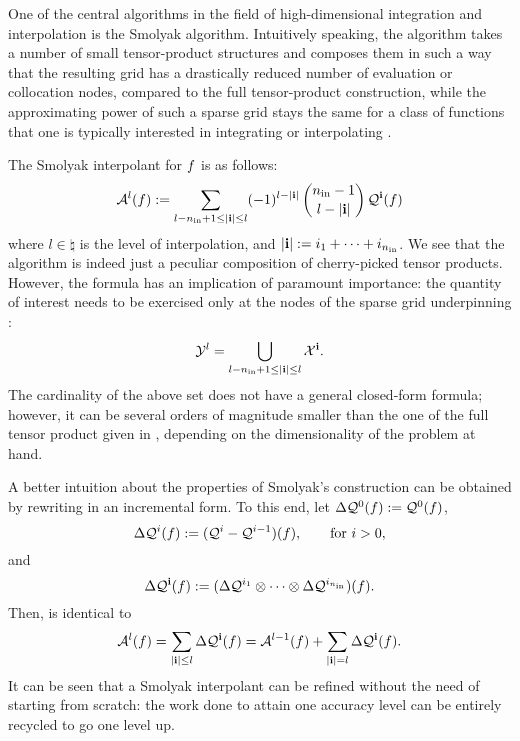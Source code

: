 One of the central algorithms in the field of high-dimensional integration and
interpolation is the Smolyak algorithm. Intuitively speaking, the algorithm
takes a number of small tensor-product structures and composes them in such a
way that the resulting grid has a drastically reduced number of evaluation or
collocation nodes, compared to the full tensor-product construction, while the
approximating power of such a sparse grid stays the same for a class of
functions that one is typically interested in integrating or interpolating
\cite{klimke2006}.

The Smolyak interpolant for $f$ is as follows:
\begin{equation} \elab{smolyak}
  \smolyak{l}(\f) := \sum_{l - \nin + 1 \leq |\vi| \leq l} (-1)^{l - |\vi|} \, {\nin - 1 \choose l - |\vi|} \, \tensor{\vi}(\f)
\end{equation}
where $l \in \natural$ is the level of interpolation, and $|\mathbf{i}| := i_1 + \dots
+ i_{n_\text{in}}$. We see that the algorithm is indeed just a peculiar composition of
cherry-picked tensor products. However, the formula has an implication of
paramount importance: the quantity of interest needs to be exercised only at the
nodes of the sparse grid underpinning :
\begin{equation} \elab{smolyak-grid}
  \Y^l = \bigcup_{l - \nin + 1 \leq |\vi| \leq l} \X^\vi.
\end{equation}
The cardinality of the above set does not have a general closed-form formula;
however, it can be several orders of magnitude smaller than the one of the full
tensor product given in , depending on the
dimensionality of the problem at hand.

A better intuition about the properties of Smolyak's construction can be
obtained by rewriting  in an incremental form. To this end, let
$\Delta\mathcal{Q}^{0}(f) := \mathcal{Q}^{0}(f)$,
\begin{equation} \elab{tensor-delta-1d}
  \Delta\tensor{i}(\f) := (\tensor{i} - \tensor{i - 1})(\f), \qquad \text{for $i > 0$},
\end{equation}
and
\begin{equation} \elab{tensor-delta}
  \Delta\tensor{\vi}(\f) := (\Delta\tensor{i_1} \otimes \cdots \otimes \Delta\tensor{i_\nin})(\f).
\end{equation}
Then,  is identical to
\begin{equation} \elab{smolyak-incremental}
  \smolyak{l}(\f) = \sum_{|\vi| \leq l} \Delta\tensor{\vi}(\f) = \smolyak{l - 1}(\f) + \sum_{|\vi| = l} \Delta\tensor{\vi}(\f).
\end{equation}
It can be seen that a Smolyak interpolant can be refined without the need of
starting from scratch: the work done to attain one accuracy level can be
entirely recycled to go one level up.

